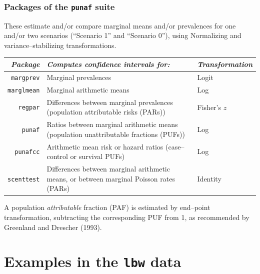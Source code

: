 \documentclass[11pt]{beamer}
\begin{document}
\begin{frame}
\frametitle{Packages of the \texttt{punaf} suite}

These estimate and/or compare marginal means and/or prevalences for one and/or two scenarios
(``Scenario 1'' and ``Scenario 0''),
using Normalizing and variance--stabilizing transformations.

{\scriptsize

\begin{center}
\begin{tabular}{rp{50mm}l}
\hline
\textit{Package}&\textit{Computes confidence intervals for:}&\textit{Transformation}\\
\hline
\texttt{margprev}&Marginal prevalences&Logit\\
\texttt{marglmean}&Marginal arithmetic means&Log\\
\texttt{regpar}&Differences between marginal prevalences (population attributable risks (PARs))&Fisher's $z$\\
\texttt{punaf}&Ratios between marginal arithmetic means (population unattributable fractions (PUFs))&Log\\
\texttt{punafcc}&Arithmetic mean risk or hazard ratios (case--control or survival PUFs)&Log\\
\texttt{scenttest}&Differences between marginal arithmetic means, or between marginal Poisson rates (PARs)&Identity\\
\hline
\end{tabular}
\end{center}

}

A population \textit{attributable} fraction (PAF) is estimated by end--point transformation,
subtracting the corresponding PUF from 1,
as recommended by Greenland and Drescher (1993)\cite{greenland1993}.

\end{frame}

\section{Examples in the \texttt{lbw} data}
\end{document}
